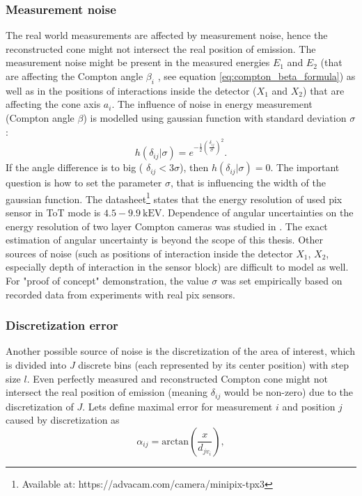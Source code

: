 \subsubsection{Measurement noise}
The real world measurements are affected by measurement noise, hence the reconstructed cone might not intersect the real position of emission.
The measurement noise might be present in the measured energies $E_{1}$ and $E_{2}$ (that are affecting the Compton angle $\beta_{i}$ , see equation \ref{eq:compton_beta_formula}) 
as well as in the positions of interactions inside the detector ($X_{1}$ and $X_{2}$) 
that are affecting the cone axis $a_{i}$.
The influence of noise in energy measurement (Compton angle $\beta$) is modelled using gaussian function with standard deviation $\sigma$:
\begin{equation}
  h(\delta_{ij}|\sigma) = e^{-\frac{1}{2}(\frac{\delta_{ij}}{\sigma})^{2}}.
\end{equation}
If the angle difference is to big ( $\delta_{ij}<3\sigma$), then $h(\delta_{ij}|\sigma) = 0$.
The important question is how to set the parameter $\sigma$, that is influencing the width of the gaussian function.
The datasheet\footnote{Available at: https://advacam.com/camera/minipix-tpx3}
states that the energy resolution of used \ac{pix} sensor in \ac{ToT} mode is $4.5 - 9.9\ \mathrm{kEV}$. 
Dependence of angular uncertainties on the energy resolution of two layer Compton cameras was studied in \cite{ordonez}.
The exact estimation of angular uncertainty is beyond the scope of this thesis.
Other sources of noise (such as positions of interaction inside the detector $X_{1}$, $X_{2}$, especially depth of interaction in the sensor block) are difficult to model as well.
For "proof of concept" demonstration, the value $\sigma$ was set empirically based on recorded data from experiments with real \ac{pix} sensors.

\subsubsection{Discretization error}
Another possible source of noise is the discretization of the area of interest, which is divided into $J$ discrete bins (each represented by its center position) with step size $l$.
Even perfectly measured and reconstructed Compton cone might not intersect the real position of emission (meaning $\delta_{ij}$ would be non-zero) due to the discretization of $J$.
Lets define maximal error for measurement $i$ and position $j$ caused by discretization as
\begin{equation}
  \alpha_{ij} = \mathrm{arctan}(\frac{x}{d_{jv_{i}}}),
  \label{eq:alpha}
\end{equation}

